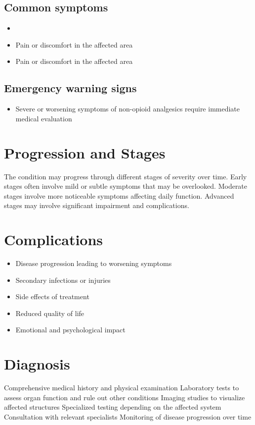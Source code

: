 \subsection{Common symptoms}
\begin{itemize}[noitemsep]
  \item \item Pain or discomfort in the affected area    \item Pain or discomfort in the affected area
  \end{itemize}

\subsection{Emergency warning signs}
\begin{itemize}[noitemsep]
  \item Severe or worsening symptoms of non-opioid analgesics require immediate medical evaluation
\end{itemize}
\section{Progression and Stages}
The condition may progress through different stages of severity over time. Early stages often involve mild or subtle symptoms that may be overlooked. Moderate stages involve more noticeable symptoms affecting daily function. Advanced stages may involve significant impairment and complications.
\section{Complications}
\begin{itemize}[noitemsep]
  \item Disease progression leading to worsening symptoms
  \item Secondary infections or injuries
  \item Side effects of treatment
  \item Reduced quality of life
  \item Emotional and psychological impact
\end{itemize}
\section{Diagnosis}
Comprehensive medical history and physical examination Laboratory tests to assess organ function and rule out other conditions Imaging studies to visualize affected structures Specialized testing depending on the affected system Consultation with relevant specialists Monitoring of disease progression over time

